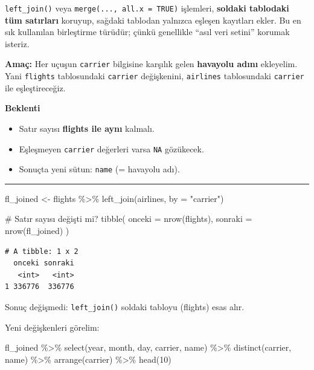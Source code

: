 \documentclass[
  letterpaper,
  DIV=11,
  numbers=noendperiod]{scrreprt}
\newenvironment{Shaded}{\begin{snugshade}}{\end{snugshade}}
\newcommand{\AttributeTok}[1]{\textcolor[rgb]{0.40,0.45,0.13}{#1}}
\newcommand{\CommentTok}[1]{\textcolor[rgb]{0.37,0.37,0.37}{#1}}
\newcommand{\DecValTok}[1]{\textcolor[rgb]{0.68,0.00,0.00}{#1}}
\newcommand{\FunctionTok}[1]{\textcolor[rgb]{0.28,0.35,0.67}{#1}}
\newcommand{\NormalTok}[1]{\textcolor[rgb]{0.00,0.23,0.31}{#1}}
\newcommand{\OtherTok}[1]{\textcolor[rgb]{0.00,0.23,0.31}{#1}}
\newcommand{\SpecialCharTok}[1]{\textcolor[rgb]{0.37,0.37,0.37}{#1}}
\newcommand{\StringTok}[1]{\textcolor[rgb]{0.13,0.47,0.30}{#1}}
\providecommand{\tightlist}{%
  \setlength{\itemsep}{0pt}\setlength{\parskip}{0pt}}
\begin{document}
\texttt{left\_join()} veya \texttt{merge(...,\ all.x\ =\ TRUE)}
işlemleri, \textbf{soldaki tablodaki tüm satırları} koruyup, sağdaki
tablodan yalnızca eşleşen kayıtları ekler. Bu en sık kullanılan
birleştirme türüdür; çünkü genellikle ``asıl veri setini'' korumak
isteriz.

\textbf{Amaç:} Her uçuşun \texttt{carrier} bilgisine karşılık gelen
\textbf{havayolu adını} ekleyelim. Yani \texttt{flights} tablosundaki
\texttt{carrier} değişkenini, \texttt{airlines} tablosundaki
\texttt{carrier} ile eşleştireceğiz.

\textbf{Beklenti}

\begin{itemize}
\tightlist
\item
  Satır sayısı \textbf{flights ile aynı} kalmalı.
\item
  Eşleşmeyen \texttt{carrier} değerleri varsa \texttt{NA} gözükecek.
\item
  Sonuçta yeni sütun: \texttt{name} (= havayolu adı).
\end{itemize}

\begin{center}\rule{0.5\linewidth}{0.5pt}\end{center}

\begin{Shaded}
\begin{Highlighting}[]
\NormalTok{fl\_joined }\OtherTok{\textless{}{-}}\NormalTok{ flights }\SpecialCharTok{\%\textgreater{}\%}
  \FunctionTok{left\_join}\NormalTok{(airlines, }\AttributeTok{by =} \StringTok{"carrier"}\NormalTok{)}

\CommentTok{\# Satır sayısı değişti mi?}
\FunctionTok{tibble}\NormalTok{(}
  \AttributeTok{onceki =} \FunctionTok{nrow}\NormalTok{(flights),}
  \AttributeTok{sonraki =} \FunctionTok{nrow}\NormalTok{(fl\_joined)}
\NormalTok{)}
\end{Highlighting}
\end{Shaded}

\begin{verbatim}
# A tibble: 1 x 2
  onceki sonraki
   <int>   <int>
1 336776  336776
\end{verbatim}

Sonuç değişmedi: \texttt{left\_join()} soldaki tabloyu (flights) esas
alır.

Yeni değişkenleri görelim:

\begin{Shaded}
\begin{Highlighting}[]
\NormalTok{fl\_joined }\SpecialCharTok{\%\textgreater{}\%}
\FunctionTok{select}\NormalTok{(year, month, day, carrier, name) }\SpecialCharTok{\%\textgreater{}\%}
\FunctionTok{distinct}\NormalTok{(carrier, name) }\SpecialCharTok{\%\textgreater{}\%}
\FunctionTok{arrange}\NormalTok{(carrier) }\SpecialCharTok{\%\textgreater{}\%}
\FunctionTok{head}\NormalTok{(}\DecValTok{10}\NormalTok{)}
\end{Highlighting}
\end{Shaded}
\end{document}
